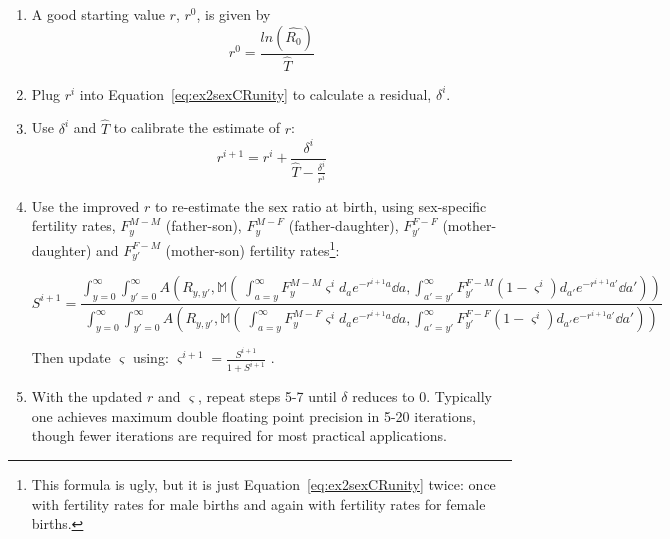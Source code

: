 \begin{enumerate}
  \item A good starting value $r$, $r^0$, is given by
   \begin{equation}
   r^0 = \frac{ln(\widehat{R_0})}{\widehat{T}}
   \end{equation}
  \item Plug $r^i$ into Equation~\ref{eq:ex2sexCRunity} to calculate a
  residual, $\delta^i$.
  \item Use $\delta^i$ and $\widehat{T}$ to calibrate the estimate of $r$:
  \begin{equation}
  r^{i+1} = r^i + \frac{\delta^i}{\widehat{T} - \frac{\delta^i}{r^i}}
  \end{equation}
  \item Use the improved $r$ to re-estimate the sex ratio at birth, using
  sex-specific fertility rates, $F_y^{M-M}$ (father-son), $F_y^{M-F}$
  (father-daughter), $F_{y'}^{F-F}$ (mother-daughter) and $F_{y'}^{F-M}$
  (mother-son) fertility rates\footnote{This formula is ugly, but it is just
  Equation~\eqref{eq:ex2sexCRunity} twice: once with fertility rates for male
  births and again with fertility rates for female births.}:
  \begin{adjustwidth}{-1in}{0in}
  \begin{equation}
  S^{i+1} = \frac{\int_{y=0}^\infty \int_{y'=0}^\infty
A\left(R_{y,y'},\mathbb{M}\left(\;\int_{a=y}^\infty F_y^{M-M} \varsigma^i
d_ae^{-r^{i+1}a} \dd a, \int _{a'=y'}^\infty F_{y'}^{F-M} (1-\varsigma^i)
d_{a'}e^{-r^{i+1}a'} \dd a'\right)\right)}{\int_{y=0}^\infty \int_{y'=0}^\infty
A\left(R_{y,y'}, \mathbb{M}\left(\;\int_{a=y}^\infty F_y^{M-F} \varsigma^i d_a
e^{-r^{i+1}a} \dd a, \int _{a'=y'}^\infty F_{y'}^{F-F} (1-\varsigma^i)
d_{a'}e^{-r^{i+1}a'} \dd a'\right)\right)}
  \end{equation}
  \end{adjustwidth}
  Then update $\varsigma$ using: $\varsigma^{i+1} =
  \frac{S^{i+1}}{1+S^{i+1}}$ .
  \item With the updated $r$ and $\varsigma$, repeat steps 5-7 until $\delta$
  reduces to 0. Typically one achieves maximum double floating point precision
  in 5-20 iterations, though fewer iterations are required for
  most practical applications.
\end{enumerate}











